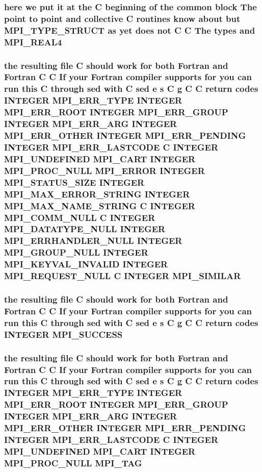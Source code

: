 \subsubsection{\setlength{\rightskip}{0pt plus 5cm}here we put it at the C beginning of the common block The point to point and collective C routines know about but MPI\_\-TYPE\_\-STRUCT as yet does not C C The types and {\bf MPI\_\-REAL4}}\label{mpif_8h_b38beff28506b606cc8c5a4cb045aaa3}


\subsubsection{\setlength{\rightskip}{0pt plus 5cm}the resulting file C should {\bf work} for both Fortran and Fortran C C If your Fortran compiler supports for you can run this C through sed {\bf with} C sed e s C g C C return codes INTEGER MPI\_\-ERR\_\-TYPE INTEGER MPI\_\-ERR\_\-ROOT INTEGER MPI\_\-ERR\_\-GROUP INTEGER MPI\_\-ERR\_\-ARG INTEGER MPI\_\-ERR\_\-OTHER INTEGER MPI\_\-ERR\_\-PENDING INTEGER MPI\_\-ERR\_\-LASTCODE C INTEGER MPI\_\-UNDEFINED MPI\_\-CART INTEGER MPI\_\-PROC\_\-NULL MPI\_\-ERROR INTEGER MPI\_\-STATUS\_\-SIZE INTEGER MPI\_\-MAX\_\-ERROR\_\-STRING INTEGER MPI\_\-MAX\_\-NAME\_\-STRING C INTEGER MPI\_\-COMM\_\-NULL C INTEGER MPI\_\-DATATYPE\_\-NULL INTEGER MPI\_\-ERRHANDLER\_\-NULL INTEGER MPI\_\-GROUP\_\-NULL INTEGER MPI\_\-KEYVAL\_\-INVALID INTEGER MPI\_\-REQUEST\_\-NULL C INTEGER {\bf MPI\_\-SIMILAR}}\label{mpif_8h_fe6c4041a40dad0cf63e0c9054e4bf49}


\subsubsection{\setlength{\rightskip}{0pt plus 5cm}the resulting file C should {\bf work} for both Fortran and Fortran C C If your Fortran compiler supports for you can run this C through sed {\bf with} C sed e s C g C C return codes INTEGER {\bf MPI\_\-SUCCESS}}\label{mpif_8h_e85dccbe6561d9573ef9d25d4bc9005b}


\subsubsection{\setlength{\rightskip}{0pt plus 5cm}the resulting file C should {\bf work} for both Fortran and Fortran C C If your Fortran compiler supports for you can run this C through sed {\bf with} C sed e s C g C C return codes INTEGER MPI\_\-ERR\_\-TYPE INTEGER MPI\_\-ERR\_\-ROOT INTEGER MPI\_\-ERR\_\-GROUP INTEGER MPI\_\-ERR\_\-ARG INTEGER MPI\_\-ERR\_\-OTHER INTEGER MPI\_\-ERR\_\-PENDING INTEGER MPI\_\-ERR\_\-LASTCODE C INTEGER MPI\_\-UNDEFINED MPI\_\-CART INTEGER MPI\_\-PROC\_\-NULL {\bf MPI\_\-TAG}}\label{mpif_8h_a81f1159c044e7a170c2b72174d3e055}


